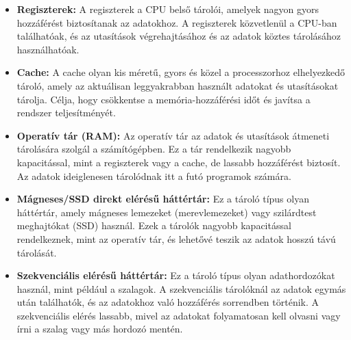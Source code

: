 \documentclass[11pt,a4paper]{article}
\begin{document}
            \begin{tcolorbox}[colback=blue!5!white,colframe=blue!50!black,title= 12. Ismertesse a tárolók hierarchia szintjeit!]
                \begin{itemize}
                    \item \textbf{Regiszterek:} A regiszterek a CPU belső tárolói, amelyek nagyon gyors hozzáférést biztosítanak az adatokhoz. A regiszterek közvetlenül a CPU-ban találhatóak, és az utasítások végrehajtásához és az adatok köztes tárolásához használhatóak.
                    \item \textbf{Cache:} A cache olyan kis méretű, gyors és közel a processzorhoz elhelyezkedő tároló, amely az aktuálisan leggyakrabban használt adatokat és utasításokat tárolja. Célja, hogy csökkentse a memória-hozzáférési időt és javítsa a rendszer teljesítményét.
                    \item \textbf{Operatív tár (RAM):} Az operatív tár az adatok és utasítások átmeneti tárolására szolgál a számítógépben. Ez a tár rendelkezik nagyobb kapacitással, mint a regiszterek vagy a cache, de lassabb hozzáférést biztosít. Az adatok ideiglenesen tárolódnak itt a futó programok számára.
                    \item \textbf{Mágneses/SSD direkt elérésű háttértár:} Ez a tároló típus olyan háttértár, amely mágneses lemezeket (merevlemezeket) vagy szilárdtest meghajtókat (SSD) használ. Ezek a tárolók nagyobb kapacitással rendelkeznek, mint az operatív tár, és lehetővé teszik az adatok hosszú távú tárolását.
                    \item \textbf{Szekvenciális elérésű háttértár:} Ez a tároló típus olyan adathordozókat használ, mint például a szalagok. A szekvenciális tárolóknál az adatok egymás után találhatók, és az adatokhoz való hozzáférés sorrendben történik. A szekvenciális elérés lassabb, mivel az adatokat folyamatosan kell olvasni vagy írni a szalag vagy más hordozó mentén.
                \end{itemize}
            \end{tcolorbox}
            
\end{document}
